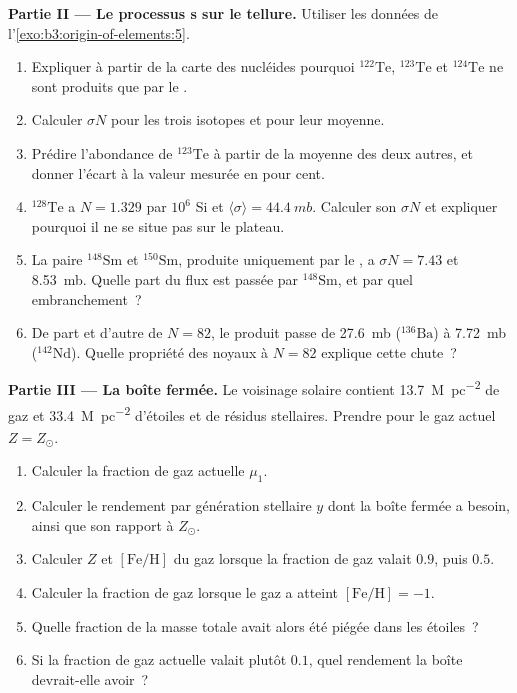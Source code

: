 \begin{problem}
\medskip\noindent\textbf{Partie II --- Le processus s sur le tellure.} Utiliser
les données de l'\cref{exo:b3:origin-of-elements:5}.
\begin{enumerate}[resume]
\item Expliquer à partir de la carte des nucléides pourquoi $^{122}\mathrm{Te}$,
  $^{123}\mathrm{Te}$ et $^{124}\mathrm{Te}$ ne sont produits que par le .
\item Calculer $\sigma N$ pour les trois isotopes et pour leur moyenne.
\item Prédire l'abondance de $^{123}\mathrm{Te}$ à partir de la moyenne
  des deux autres, et donner l'écart à la valeur mesurée
  en pour cent.
\item $^{128}\mathrm{Te}$ a $N = 1.329$ par $10^6$ Si et
  $\langle\sigma\rangle = \qty{44.4}{mb}$. Calculer son $\sigma N$ et
  expliquer pourquoi il ne se situe pas sur le plateau.
\item La paire $^{148}\mathrm{Sm}$ et $^{150}\mathrm{Sm}$, produite uniquement
  par le , a $\sigma N = \num{7.43}$ et \qty{8.53}{mb}. Quelle part
  du flux est passée par $^{148}\mathrm{Sm}$, et par quel embranchement~?
\item De part et d'autre de $N = 82$, le produit passe de \qty{27.6}{mb}
  ($^{136}\mathrm{Ba}$) à \qty{7.72}{mb} ($^{142}\mathrm{Nd}$). Quelle propriété
  des noyaux à $N = 82$ explique cette chute~?
\end{enumerate}

\medskip\noindent\textbf{Partie III --- La boîte fermée.} Le voisinage solaire
contient \qty{13.7}{M_\odot.pc^{-2}} de gaz et
\qty{33.4}{M_\odot.pc^{-2}} d'étoiles et de résidus stellaires. Prendre pour
le gaz actuel $Z = Z_\odot$.
\begin{enumerate}[resume]
\item Calculer la fraction de gaz actuelle $\mu_1$.
\item Calculer le rendement par génération stellaire $y$ dont la boîte fermée
  a besoin, ainsi que son rapport à $Z_\odot$.
\item Calculer $Z$ et $[\mathrm{Fe/H}]$ du gaz lorsque la fraction de gaz
  valait $0.9$, puis $0.5$.
\item Calculer la fraction de gaz lorsque le gaz a atteint
  $[\mathrm{Fe/H}] = -1$.
\item Quelle fraction de la masse totale avait alors été piégée dans les étoiles~?
\item Si la fraction de gaz actuelle valait plutôt $0.1$, quel
  rendement la boîte devrait-elle avoir~?
\end{enumerate}


\end{problem}
